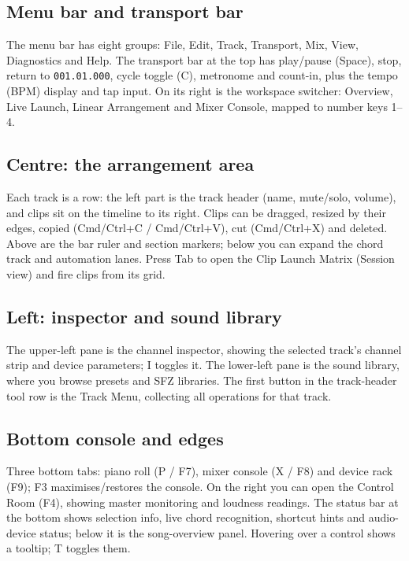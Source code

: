 \subsection{Menu bar and transport bar}

The menu bar has eight groups: File, Edit, Track, Transport, Mix, View, Diagnostics
and Help. The transport bar at the top has play/pause (Space), stop, return to
\texttt{001.01.000}, cycle toggle (C), metronome and count-in, plus the tempo (BPM)
display and tap input. On its right is the workspace switcher: Overview, Live Launch,
Linear Arrangement and Mixer Console, mapped to number keys 1--4.


\subsection{Centre: the arrangement area}

Each track is a row: the left part is the track header (name, mute/solo, volume), and
clips sit on the timeline to its right. Clips can be dragged, resized by their edges,
copied (Cmd/Ctrl+C / Cmd/Ctrl+V), cut (Cmd/Ctrl+X) and deleted. Above are the bar ruler
and section markers; below you can expand the chord track and automation lanes. Press
Tab to open the Clip Launch Matrix (Session view) and fire clips from its grid.

\subsection{Left: inspector and sound library}

The upper-left pane is the channel inspector, showing the selected track's channel
strip and device parameters; I toggles it. The lower-left pane is the sound library,
where you browse presets and SFZ libraries. The first button in the track-header tool
row is the Track Menu, collecting all operations for that track.

\subsection{Bottom console and edges}

Three bottom tabs: piano roll (P / F7), mixer console (X / F8) and device rack (F9);
F3 maximises/restores the console. On the right you can open the Control Room (F4),
showing master monitoring and loudness readings. The status bar at the bottom shows
selection info, live chord recognition, shortcut hints and audio-device status; below
it is the song-overview panel. Hovering over a control shows a tooltip; T toggles them.

